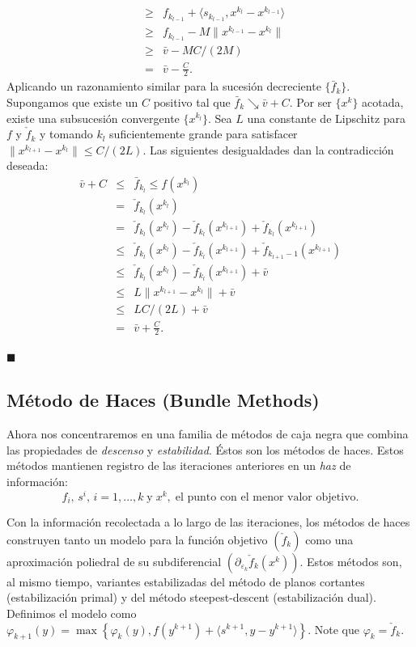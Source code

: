 \documentclass[a4paper,12pt]{report}
\newcommand{\la}{\langle}
\newcommand{\ra}{\rangle}
\newenvironment{dem}{\vspace*{-0.1cm}{\it Demostraci\'on:}}{\hfill
$\blacksquare$\\}
\begin{document}
\begin{dem}
\begin{itemize}
\begin{eqnarray*}
&\geq&f_{k_{l-1}}+\la s_{k_{l-1}},x^{k_l}-x^{k_{l-1}}\ra\\
&\geq&f_{k_{l-1}}-M\|x^{k_{l-1}}-x^{k_l}\|\\
&\geq&\bar{v}-MC/(2M)\\
&=&\bar{v}-\frac{C}{2}.
\end{eqnarray*}
Aplicando un razonamiento similar para la sucesi\'on decreciente $\{\bar{f}_k\}$. Supongamos que existe un $C$ positivo tal que $\bar{f}_k\searrow\bar{v}+C$. Por ser $\{x^k\}$ acotada, existe una subsucesi\'on convergente $\{x^{k_l}\}$. Sea $L$ una constante de Lipschitz para $f$ y $\check{f}_k$ y tomando $k_l$ suficientemente grande para satisfacer $\|x^{k_{l+1}}-x^{k_l}\|\leq C/(2L)$. Las siguientes desigualdades dan la contradicci\'on deseada:
\begin{eqnarray*}
\bar{v}+C&\leq&\bar{f}_{k_l}\leq f(x^{k_l})\\
&=&\check{f}_{k_l}(x^{k_l})\\
&=&\check{f}_{k_l}(x^{k_l})-\check{f}_{k_l}(x^{k_{l+1}})+\check{f}_{k_l}(x^{k_{l+1}})\\
&\leq&\check{f}_{k_l}(x^{k_l})-\check{f}_{k_l}(x^{k_{l+1}})+\check{f}_{k_{l+1}-1}(x^{k_{l+1}})\\
&\leq&\check{f}_{k_l}(x^{k_l})-\check{f}_{k_l}(x^{k_{l+1}})+\bar{v}\\
&\leq&L\|x^{k_{l+1}}-x^{k_l}\|+\bar{v}\\
&\leq&LC/(2L)+\bar{v}\\
&=&\bar{v}+\frac{C}{2}.
\end{eqnarray*}

\end{itemize}
\end{dem}
\subsection{M\'etodo de Haces (Bundle Methods)}
Ahora nos concentraremos en una familia de m\'etodos de caja negra que combina las propiedades de \textit{descenso} y \textit{estabilidad}. \'Estos son los m\'etodos de haces. Estos m\'etodos mantienen registro de las iteraciones anteriores en un \textit{haz} de informaci\'on:
$$f_i,\,s^i,\,i=1,\ldots ,k\;\mathrm{y}\;x^k,\;\mbox{el punto con el menor valor objetivo}.$$

Con la informaci\'on recolectada a lo largo de las iteraciones, los m\'etodos de haces construyen tanto un modelo para la funci\'on objetivo $(\check{f}_k)$ como una aproximaci\'on poliedral de su subdiferencial $(\partial_{\varepsilon_k}\check{f}_k(x^k))$. Estos m\'etodos son, al mismo tiempo, variantes estabilizadas del m\'etodo de planos cortantes (estabilizaci\'on primal) y del m\'etodo steepest-descent (estabilizaci\'on dual).
Definimos el modelo como $\varphi_{k+1}(y)=\max\left\{\varphi_k(y), f(y^{k+1})+\la s^{k+1},y-y^{k+1}\ra\right\}$. Note que $\varphi_k=\check{f}_k$.\\
\end{document}
